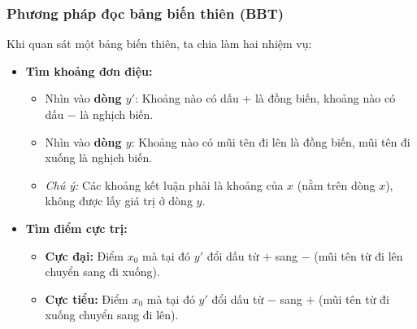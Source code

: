 \documentclass[12pt]{article}
\begin{document}
	\subsubsection{Phương pháp đọc bảng biến thiên (BBT)}
	Khi quan sát một bảng biến thiên, ta chia làm hai nhiệm vụ:
	\begin{itemize}
		\item \textbf{Tìm khoảng đơn điệu:}
		\begin{itemize}
			\item Nhìn vào \textbf{dòng $y'$}: Khoảng nào có dấu $+$ là đồng biến, khoảng nào có dấu $-$ là nghịch biến.
			\item Nhìn vào \textbf{dòng $y$}: Khoảng nào có mũi tên đi lên là đồng biến, mũi tên đi xuống là nghịch biến.
			\item \textit{Chú ý:} Các khoảng kết luận phải là khoảng của $x$ (nằm trên dòng $x$), không được lấy giá trị ở dòng $y$.
		\end{itemize}
		\item \textbf{Tìm điểm cực trị:}
		\begin{itemize}
			\item \textbf{Cực đại:} Điểm $x_0$ mà tại đó $y'$ đổi dấu từ $+$ sang $-$ (mũi tên từ đi lên chuyển sang đi xuống).
			\item \textbf{Cực tiểu:} Điểm $x_0$ mà tại đó $y'$ đổi dấu từ $-$ sang $+$ (mũi tên từ đi xuống chuyển sang đi lên).
		\end{itemize}
	\end{itemize}
	
\end{document}
